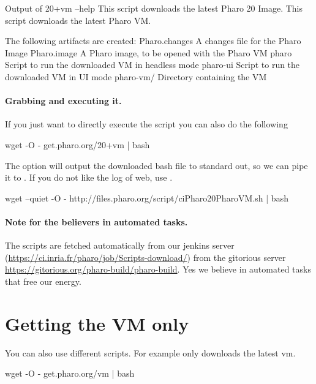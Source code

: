 \documentclass[a4paper,10pt,twoside]{book}
\begin{document}
\begin{code}{Output of 20+vm --help }
This script downloads the latest Pharo 20 Image.
This script downloads the latest Pharo VM.

The following artifacts are created:
    Pharo.changes  A changes file for the Pharo Image
    Pharo.image    A Pharo image, to be opened with the Pharo VM
    pharo          Script to run the downloaded VM in headless mode
    pharo-ui       Script to run the downloaded VM in UI mode
    pharo-vm/      Directory containing the VM
\end{code}



\paragraph{Grabbing and executing it.}
If you just want to directly execute the script you can also do the following

\begin{code}{}
wget -O - get.pharo.org/20+vm | bash
\end{code}

The option  will output the downloaded bash file to standard out, so we can pipe it to . If you do not like the log of web, use .

\begin{code}{}
wget --quiet -O - http://files.pharo.org/script/ciPharo20PharoVM.sh | bash
\end{code}

\paragraph{Note for the believers in automated tasks.} 
The scripts are fetched automatically from our jenkins server (\url{https://ci.inria.fr/pharo/job/Scripts-download/}) from the gitorious server \url{https://gitorious.org/pharo-build/pharo-build}.
Yes we believe in automated tasks that free our energy. 

\section{Getting the VM only}
You can also use different scripts. For example  only downloads the latest vm.

\begin{code}{}
wget -O - get.pharo.org/vm | bash
\end{code}
\end{document}
